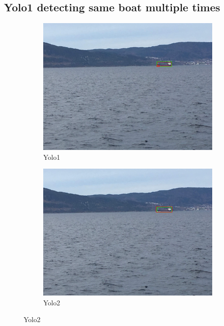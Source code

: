 \subsection{Yolo1 detecting same boat multiple times}
\label{sec:yolo1_multidetect}
\begin{figure}[h!]
\begin{subfigure}{.5\textwidth}
  \centering
  \includegraphics[width=0.8\linewidth]{results/case_tr_moor/yolo12/yolo1/2better/IMG_2365.jpg}
  \caption{Yolo1}
\end{subfigure}%
\begin{subfigure}{.5\textwidth}
  \centering
  \includegraphics[width=.8\linewidth]{results/case_tr_moor/yolo12/yolo2/2better/IMG_2365.jpg}
  \caption{Yolo2}
\end{subfigure}


\end{figure}
